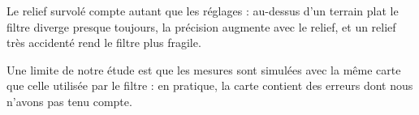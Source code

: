 \documentclass[11pt]{article}
\begin{document}
Le relief survolé compte autant que les réglages : au-dessus d'un terrain plat le
filtre diverge presque toujours, la précision augmente avec le relief, et un relief
très accidenté rend le filtre plus fragile.

Une limite de notre étude est que les mesures sont simulées avec la même carte que
celle utilisée par le filtre : en pratique, la carte contient des erreurs dont nous
n'avons pas tenu compte.
\end{document}

